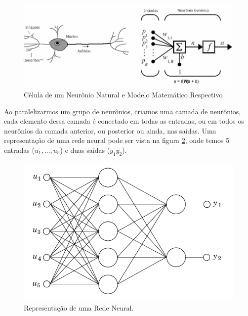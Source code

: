 \begin{figure}[H]
  \caption{Célula de um Neurônio Natural e Modelo Matemático Respectivo}
  \begin{center}
      \includegraphics[scale=0.45]{img/neuronio_unal_p6}
  \end{center}
  \label{fig:neuronio_unal_p6}
\end{figure}

Ao paralelizarmos um grupo de neurônios, criamos uma camada de neurônios, cada elemento dessa camada é conectado em todas as entradas, ou em todos os neurônios da camada anterior, ou posterior ou ainda, nas saídas. Uma representação de uma rede neural pode ser vista na figura \ref{fig:feedforward_neural_astrom_p297}, onde temos 5 entradas ($u_1,...,u_5$) e duas saídas ($y_1 y_2$).

\begin{figure}[H]
  \caption{Representação de uma Rede Neural.}
  \begin{center}
      \includegraphics[scale=0.5]{img/feedforward_neural_astrom_p297}
  \end{center}
  \label{fig:feedforward_neural_astrom_p297}
\end{figure}

